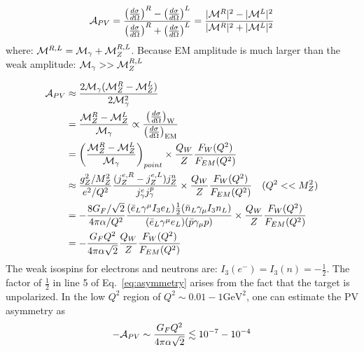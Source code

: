 \begin{equation}
    \mathcal{A}_{PV} = \frac{\left( \frac{d\sigma}{d\Omega} \right)^R - \left( \frac{d\sigma}{d\Omega} \right)^L}
    {\left( \frac{d\sigma}{d\Omega} \right)^R + \left( \frac{d\sigma}{d\Omega} \right)^L}
    = \frac{|\mathcal{M}^R|^2 - |\mathcal{M}^L|^2}{|\mathcal{M}^R|^2 + |\mathcal{M}^L|^2}
\end{equation}
where: $\mathcal{M}^{R, L} = \mathcal{M}_{\gamma} + \mathcal{M}_Z^{R,L}$. Because EM amplitude is much 
larger than the weak amplitude: $\mathcal{M}_\gamma >> \mathcal{M}_Z^{R, L}$

\begin{equation}
    \begin{aligned}
	\mathcal{A}_{PV} &\approx \frac{2\mathcal{M}_\gamma (\mathcal{M}_Z^R - \mathcal{M}_Z^L)}{2\mathcal{M}^2_\gamma}	\\
	    &= \frac{\mathcal{M}_Z^R - \mathcal{M}_Z^L}{\mathcal{M}_\gamma} \propto \frac{\left( \frac{d\sigma}{d\Omega} \right)_{\text{W}}}{\left( \frac{d\sigma}{d\Omega} \right)_{\text{EM}}}	\\
	    &= \left(\frac{\mathcal{M}_Z^R - \mathcal{M}_Z^L}{\mathcal{M}_\gamma}\right)_{point} \times \frac{Q_{W}}{Z}\frac{F_{W}(Q^2)}{F_{EM}(Q^2)}    \\
	    &\approx \frac{g^2_Z/M_Z^2}{e^2/Q^2} \frac{(j_Z^{e,R} - j_Z^{e,L}) j_Z^n}{j_\gamma^e j_\gamma^p}
		\times \frac{Q_{W}}{Z}\frac{F_{W}(Q^2)}{F_{EM}(Q^2)} 	\quad (Q^2 << M_Z^2) \\
	    &= -\frac{8G_F/\sqrt{2}}{4\pi\alpha/Q^2} 
		\frac{(\bar{e}_L\gamma^\mu I_3e_L) \frac{1}{2}(\bar{n}_L \gamma_\mu I_3 n_L)}{(\bar{e}_L\gamma^\mu e_L)(\bar{p}\gamma_\mu p)}
		\times \frac{Q_{W}}{Z}\frac{F_{W}(Q^2)}{F_{EM}(Q^2)}    \\
	    &= -\frac{G_F Q^2}{4\pi\alpha\sqrt{2}} \frac{Q_{W}}{Z}\frac{F_{W}(Q^2)}{F_{EM}(Q^2)}
    \end{aligned}
    \label{eq:asymmetry}
\end{equation}
The weak isospins for electrons and neutrons are: $I_3(e^-) = I_3(n) = -\frac{1}{2}$.
The factor of $\frac{1}{2}$ in line 5 of Eq.~\ref{eq:asymmetry} arises from
the fact that the target is unpolarized. In the low $Q^2$ region of $Q^2 \sim 0.01 - 1 \mathrm{GeV} ^2$,
one can estimate the PV asymmetry as 
\begin{equation}
    -\mathcal{A}_{PV} \sim \frac{G_F Q^2}{4\pi\alpha \sqrt{2}} \lesssim 10^{-7} - 10^{-4}
\end{equation}

